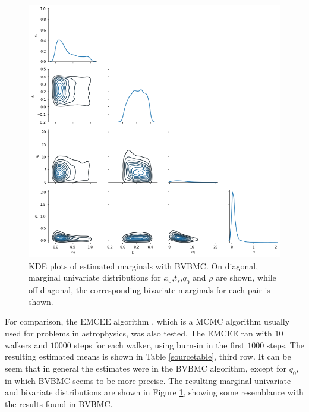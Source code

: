 \begin{figure}
	\centering
	\includegraphics[width=0.8\linewidth]{figs/sourceproblemhistogramsvb.png}
	\caption[KDE plots of estimated marginals with BVBMC. On diagonal.]{KDE plots of estimated marginals with BVBMC. On diagonal, marginal univariate distributions for $x_0$,$t_s$,$q_0$ and $\rho$ are shown, while off-diagonal, the corresponding bivariate marginals for each pair is shown.}
	\label{sourcevbhistogram} 
\end{figure}

For comparison, the EMCEE algorithm \cite{Foreman_Mackey_2013}, which is a MCMC algorithm usually used for problems in astrophysics, was also tested. The EMCEE ran with $10$ walkers and $10000$ steps for each walker, using burn-in in the first $1000$ steps. The resulting estimated means is shown in Table \ref{sourcetable}, third row. It can be seem that in general the estimates were in the BVBMC algorithm, except for $q_0$, in which BVBMC seems to be more precise. The resulting marginal univariate and bivariate distributions are shown in Figure \ref{sourcevbhistogram}, showing some resemblance with the results found in BVBMC.

